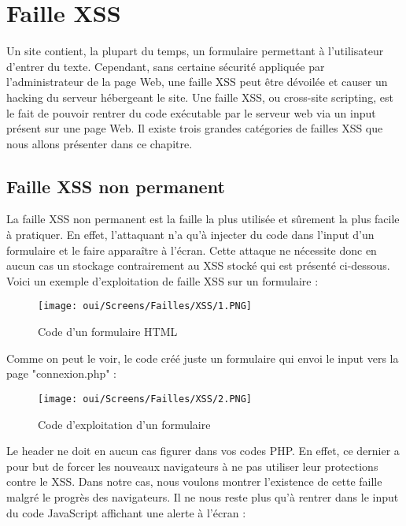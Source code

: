 \section{Faille XSS}

Un site contient, la plupart du temps, un  formulaire permettant à l’utilisateur d'entrer du texte. Cependant, sans certaine sécurité appliquée par l’administrateur de la page Web, une faille XSS peut être dévoilée et causer un hacking du serveur hébergeant le site. Une faille XSS, ou cross-site scripting, est le fait de pouvoir rentrer du code exécutable par le serveur web via un input présent sur une page Web. Il existe trois grandes catégories de failles XSS que nous allons présenter dans ce chapitre.

\subsection{Faille XSS non permanent}
La faille XSS non permanent est la faille la plus utilisée et sûrement la plus facile à pratiquer. En effet, l’attaquant n'a qu’à injecter du code dans l’input d’un formulaire et le faire apparaître à l’écran. Cette attaque ne nécessite donc en aucun cas un stockage contrairement au XSS stocké qui est présenté ci-dessous.
Voici un exemple d'exploitation de faille XSS sur un formulaire :

\begin{figure}[htp!]
  \centering
  \setlength\figureheight{7cm}
  \setlength\figurewidth{9cm}
  \texttt{[image: oui/Screens/Failles/XSS/1.PNG]}
  \caption{Code d'un formulaire HTML}
  \label{fig:courbe-tikz}
\end{figure}

Comme on peut le voir, le code créé juste un formulaire qui envoi le input vers la page "connexion.php" :

\begin{figure}[htp!]
  \centering
  \setlength\figureheight{7cm}
  \setlength\figurewidth{9cm}
  \texttt{[image: oui/Screens/Failles/XSS/2.PNG]}
  \caption{Code d'exploitation d'un formulaire}
  \label{fig:courbe-tikz}
\end{figure}

Le  header ne doit en aucun cas figurer dans vos codes PHP. En effet, ce dernier a pour but de forcer les nouveaux navigateurs à ne pas utiliser leur protections contre le XSS. Dans notre cas, nous voulons montrer l'existence de cette faille malgré le progrès des navigateurs. Il ne nous reste plus qu'à rentrer dans le input du code JavaScript affichant une alerte à l'écran :

